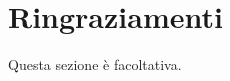 \documentclass[a4paper,oneside,12pt]{book}
\title{\thesistitle}
\author{\authorname}
\begin{document}


\section*{Ringraziamenti}
Questa sezione è facoltativa.
\newpage 

\tableofcontents
\newpage

\mainmatter






\end{document}
